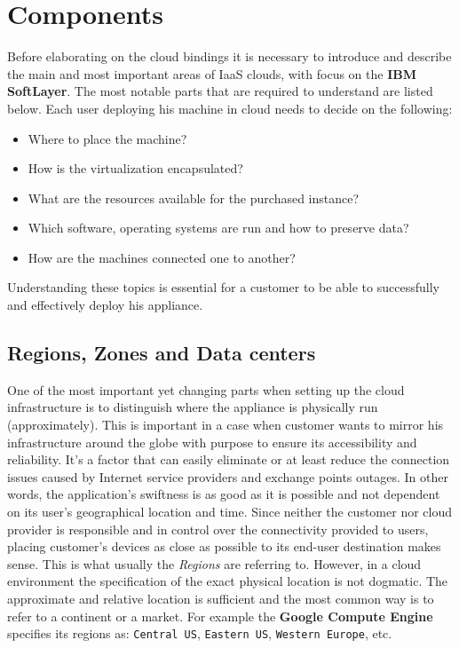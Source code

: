 \section{Components}
\label{sec:Components}

Before elaborating on the cloud bindings it is necessary to introduce and describe the main and most important areas of IaaS clouds, with focus on the \textbf{IBM SoftLayer}. The most notable parts that are required to understand are listed below. Each user deploying his machine in cloud needs to decide on the following:

\begin{itemize}
	\item Where to place the machine?
	\item How is the virtualization encapsulated?
	\item What are the resources available for the purchased instance?
	\item Which software, operating systems are run and how to preserve data?
	\item How are the machines connected one to another?
\end{itemize}

Understanding these topics is essential for a customer to be able to successfully and effectively deploy his appliance.

\subsection{Regions, Zones and Data centers}
\label{sub:Regions, Zones and Data centers}

One of the most important yet changing parts when setting up the cloud infrastructure is to distinguish where the appliance is physically run (approximately). This is important in a case when customer wants to mirror his infrastructure around the globe with purpose to ensure its accessibility and reliability. It's a factor that can easily eliminate or at least reduce the connection issues caused by Internet service providers and exchange points outages. In other words, the application's swiftness is as good as it is possible and not dependent on its user's geographical location and time. Since neither the customer nor cloud provider is responsible and in control over the connectivity provided to users, placing customer's devices as close as possible to its end-user destination makes sense. This is what usually the \emph{Regions} are referring to. However, in a cloud environment the specification of the exact physical location is not dogmatic. The approximate and relative location is sufficient and the most common way is to refer to a continent or a market. For example the \textbf{Google Compute Engine}\cite{gce} specifies its regions as: \texttt{Central US}, \texttt{Eastern US}, \texttt{Western Europe}, etc.

